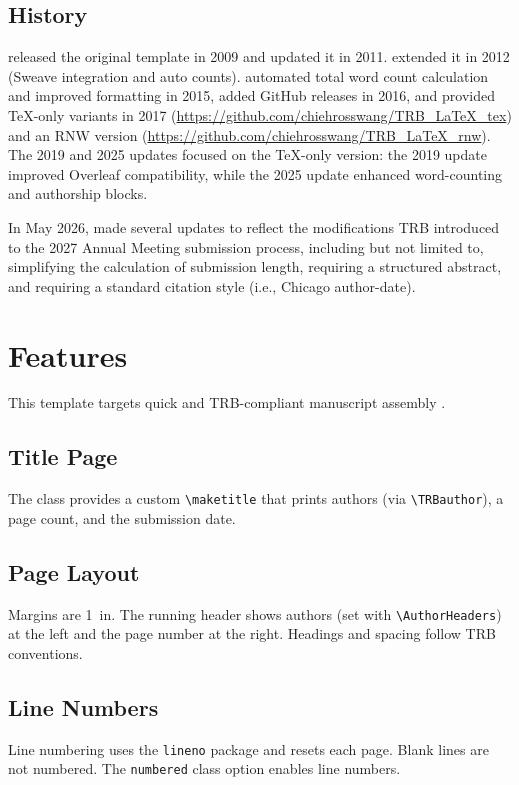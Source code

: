 \documentclass[numbered]{trbunofficial}
\begin{document}
\subsection{History}
\citet{pritchard} released the original template in 2009 and updated it in 2011. \citet{macfarlane} extended it in 2012 (Sweave integration and auto counts). \citet{wang} automated total word count calculation and improved formatting in 2015, added GitHub releases in 2016, and provided \TeX-only variants in 2017 (\url{https://github.com/chiehrosswang/TRB_LaTeX_tex}) and an RNW version (\url{https://github.com/chiehrosswang/TRB_LaTeX_rnw}). The 2019 and 2025 updates focused on the \TeX-only version: the 2019 update improved Overleaf compatibility, while the 2025 update enhanced word-counting and authorship blocks.

In May 2026, \citet{wang} made several updates to reflect the modifications TRB introduced to the 2027 Annual Meeting submission process, including but not limited to, simplifying the calculation of submission length, requiring a structured abstract, and requiring a standard citation style (i.e., Chicago author-date).

\section{Features}
This template targets quick and TRB-compliant manuscript assembly \cite{trbwebsite}.

\subsection{Title Page}
The class provides a custom \verb|\maketitle| that prints authors (via \verb|\TRBauthor|), a page count, and the submission date. 

\subsection{Page Layout}
Margins are 1~in. The running header shows authors (set with \verb|\AuthorHeaders|) at the left and the page number at the right. Headings and spacing follow TRB conventions.

\subsection{Line Numbers}
Line numbering uses the \verb|lineno| package and resets each page. Blank lines are not numbered. The \verb|numbered| class option enables line numbers.
\end{document}
